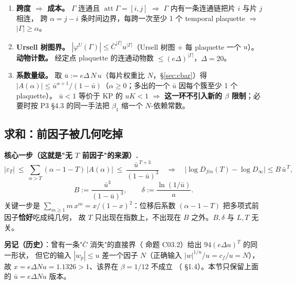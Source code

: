 \begin{enumerate}[label=(\arabic*)]
\item \textbf{跨度 $\Rightarrow$ 成本。}\LT{} $\Gamma$ 连通且 $\operatorname{att}\Gamma=[i,j]$ $\Rightarrow$ $\Gamma$ 内有一条连通链把片 $i$ 与片 $j$ 相连，
跨 $\alpha=j-i$ 条时间边界，每跨一次至少 1 个 temporal plaquette $\Rightarrow$ $|\Gamma|\ge\alpha$。

\item \textbf{Ursell 树图界。}\LT{} $|\varphi^U(\Gamma)|\le\bar C^{|\Gamma|}u^{|\Gamma|}$（Ursell 树图 + 每 plaquette 一个 $u$）。\\
\textbf{动物计数。}\LT{} 经定点 plaquette 的连通动物数 $\le(e\Delta)^{|\Gamma|}$，$\Delta=20$。

\item \textbf{系数量级。}\LT{} 取 $\bar u:=e\Delta\,N\,u$（每片权重比 $N$，\S\ref{sec:cbar}）得
$|A(\alpha)|\le\bar u^{\alpha+1}/(1-\bar u)$（$\alpha\ge0$；多出的一个 $\bar u$ 因每个簇至少 1 个 plaquette）。
$\bar u<1$ 等价于 KP 的 $uK<1$ $\Rightarrow$ \textbf{这一环不引入新的 $\beta$ 限制}；必要时按 P3 \S4.3 的同一手法把 $\beta_1$ 缩一个 $N$-依赖常数。
\end{enumerate}

\subsection{求和：前因子被几何吃掉}

\begin{keybox}
\textbf{核心一步（这就是"无 $T$ 前因子"的来源）.}\LT
\[
|\varepsilon_T|\ \le\ \sum_{\alpha>T}(\alpha-1-T)\,|A(\alpha)|\ \le\ \frac{\bar u^{\,T+3}}{(1-\bar u)^3}
\quad\Longrightarrow\quad
\bigl|\log D_{fin}(T)-\log D_\infty\bigr|\le B\,\bar u^{\,T},
\]
\[
B:=\frac{\bar u^3}{(1-\bar u)^3},\qquad \delta:=\frac{\ln(1/\bar u)}{a}.
\]
关键一步是 $\sum_{m\ge1}m\,x^m=x/(1-x)^2$：位移后系数 $(\alpha-1-T)$ 把多项式前因子\textbf{恰好}吃成纯几何，
故 $T$ 只出现在指数上，不出现在 $B$ 之外。$B,\delta$ 与 $L,T$ 无关。
\par\smallskip
\textbf{另记（历史）}：曾有一条"$\bar C$ 消失"的直接界（ 命题 C03.2）给出 $94(e\Delta u)^T$ 的同一形状，
但它的输入 $|w_p|\le u$ 差一个因子 $N$（正确输入 $|w|^{1/n}/u=c_f/u=N$），故 $x=e\Delta Nu=1.1326>1$、该界在 $\beta=1/12$ 不成立
（ \S1.4）。本节只保留上面的 $\bar u=e\Delta Nu$ 版本。
\end{keybox}


